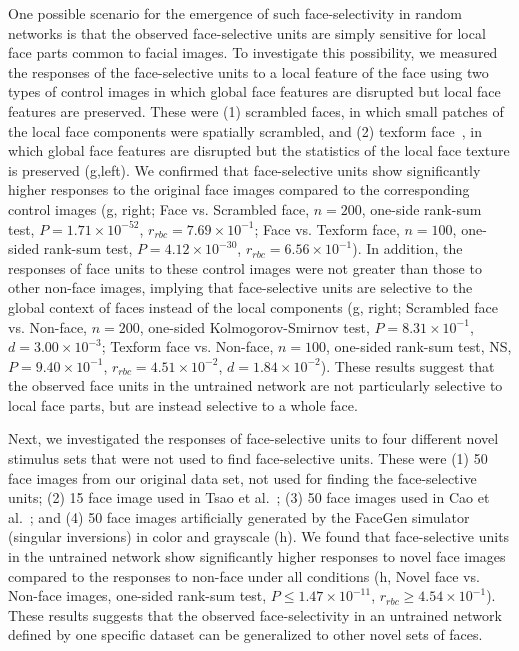 \documentclass[final,3p,times,twocolumn]{elsarticle}
\begin{document}
One possible scenario for the emergence of such face-selectivity in random networks is that the observed face-selective units are simply sensitive for local face parts common to facial images.
To investigate this possibility, we measured the responses of the face-selective units to a local feature of the face using two types of control images in which global face features are disrupted but local face features are preserved.
These were (1) scrambled faces, in which small patches of the local face components were spatially scrambled, and (2) texform face~\cite{long2018mid}, in which global face features are disrupted but the statistics of the local face texture is preserved (g,left).
We confirmed that face-selective units show significantly higher responses to the original face images compared to the corresponding control images (g, right; 
Face vs. Scrambled face, $ n=200 $, one-side rank-sum test, $ P=1.71 \times 10^{-52} $, $ r_{rbc}=7.69 \times 10^{-1} $;
Face vs. Texform face, $ n=100 $, one-sided rank-sum test, $ P=4.12\times10^{-30} $, $ r_{rbc}=6.56\times 10^{-1} $).
In addition, the responses of face units to these control images were not greater than those to other non-face images, implying that face-selective units are selective to the global context of faces instead of the local components (g, right; Scrambled face vs. Non-face, $ n=200 $, one-sided Kolmogorov-Smirnov test, $ P=8.31 \times 10^{-1} $, $ d=3.00 \times 10^{-3} $; 
Texform face vs. Non-face, $ n=100 $, one-sided rank-sum test, NS, $ P=9.40 \times 10^{-1} $, $ r_{rbc}=4.51 \times 10^{-2} $, $ d=1.84 \times 10^{-2} $).
These results suggest that the observed face units in the untrained network are not particularly selective to local face parts, but are instead selective to a whole face.


Next, we investigated the responses of face-selective units to four different novel stimulus sets that were not used to find face-selective units.
These were
(1) 50 face images from our original data set, not used for finding the face-selective units;
(2) 15 face image used in Tsao et al.~\cite{tsao2006cortical,freiwald2010functional};
(3) 50 face images used in Cao et al.~\cite{cao2018vggface2};
and (4) 50 face images artificially generated by the FaceGen simulator (singular inversions) in color and grayscale (h).
We found that face-selective units in the untrained network show significantly higher responses to novel face images compared to the responses to non-face under all conditions (h, Novel face vs. Non-face images, one-sided rank-sum test, $ P \leq 1.47 \times 10^{-11} $, $ r_{rbc} \geq 4.54 \times 10^{-1}$).
These results suggests that the observed face-selectivity in an untrained network defined by one specific dataset can be generalized to other novel sets of faces.
\end{document}
